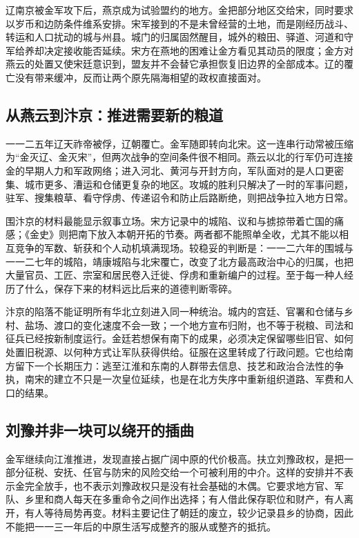 辽南京被金军攻下后，燕京成为试验盟约的地方。金把部分地区交给宋，同时要求以岁币和边防条件维系安排。宋军接到的不是未曾经营的土地，而是刚经历战斗、转运和人口扰动的城与州县。城门的归属固然醒目，城外的粮田、驿道、河道和守军给养却决定接收能否延续。宋方在燕地的困难让金方看见其动员的限度；金方对燕云的处置又使宋廷意识到，盟友并不会替它承担恢复旧边界的全部成本。辽的覆亡没有带来缓冲，反而让两个原先隔海相望的政权直接面对。

\subsection{从燕云到汴京：推进需要新的粮道}

一一二五年辽天祚帝被俘，辽朝覆亡。金军随即转向北宋。这一连串行动常被压缩为“金灭辽、金灭宋”，但两次战争的空间条件很不相同。燕云以北的行军仍可连接金的早期人力和军政网络；进入河北、黄河与开封方向，军队面对的是人口更密集、城市更多、漕运和仓储更复杂的地区。攻城的胜利只解决了一时的军事问题，驻军、搜集粮草、看守俘虏、传递诏令和防止后路断绝，则把战争拉入地方日常。

围汴京的材料最能显示叙事立场。宋方记录中的城陷、议和与掳掠带着亡国的痛感；《金史》则把南下放入本朝开拓的节奏。两者都不能照单全收，尤其不能以相互竞争的军数、斩获和个人动机填满现场。较稳妥的判断是：一一二六年的围城与一一二七年的城陷，靖康城陷与北宋覆亡，改变了北方最高政治中心的归属，也把大量官员、工匠、宗室和居民卷入迁徙、俘虏和重新编户的过程。至于每一种人经历了什么，保存下来的材料远比后来的道德判断零碎。

汴京的陷落不能证明所有华北立刻进入同一种统治。城内的宫廷、官署和仓储与乡村、盐场、渡口的变化速度不会一致；一个地方宣布归附，也不等于税粮、司法和征兵已经按新制度运行。金廷若想保有南下的成果，必须决定保留哪些旧官、如何处置旧税源、以何种方式让军队获得供给。征服在这里转成了行政问题。它也给南方留下一个长期压力：逃至江淮和东南的人群带去信息、技艺和政治合法性的争执，南宋的建立不只是一次皇位延续，也是在北方失序中重新组织道路、军费和人口的结果。

\subsection{刘豫并非一块可以绕开的插曲}

金军继续向江淮推进，发现直接占据广阔中原的代价极高。扶立刘豫政权，是把一部分征税、安抚、任官与防宋的风险交给一个可被利用的中介。这样的安排并不表示金完全放手，也不表示刘豫政权只是没有社会基础的木偶。它要求地方官、军队、乡里和商人每天在多重命令之间作出选择；有人借此保存职位和财产，有人离开，有人等待局势再变。材料主要记住了朝廷的废立，较少记录县乡的协商，因此不能把一一三一年后的中原生活写成整齐的服从或整齐的抵抗。

